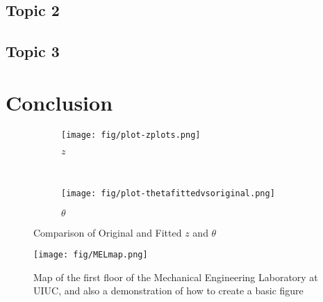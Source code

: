 \documentclass[hidelinks,11pt]{article}
\numberwithin{equation}{subsection}
\begin{document}
\subsection*{Topic 2}

\lipsum[1]

\subsection*{Topic 3}

\lipsum[1-2]

\section*{Conclusion}

\lipsum[1-2]
\pagebreak

\begin{figure}[p]
  \centering
  \begin{subfigure}[b]{0.7\textwidth}
    \centering
		\texttt{[image: fig/plot-zplots.png]}
    \caption{$z$}
    \label{fig:plot-z}
  \end{subfigure}
  \\[1cm]
  \begin{subfigure}[b]{0.7\textwidth}
    \centering
		\texttt{[image: fig/plot-thetafittedvsoriginal.png]}
    \caption{$\theta$}
    \label{fig:plot-theta}
  \end{subfigure}
  \caption{Comparison of Original and Fitted $z$ and $\theta$}
  \label{fig:theta}
\end{figure}


\begin{figure}[h] 
  \centering %
	\texttt{[image: fig/MELmap.png]} %
    \caption{Map of the first floor of the Mechanical Engineering Laboratory at UIUC, and also a demonstration of how to create a basic figure}
    \label{fig:MELmap} %
\end{figure}
\end{document}
